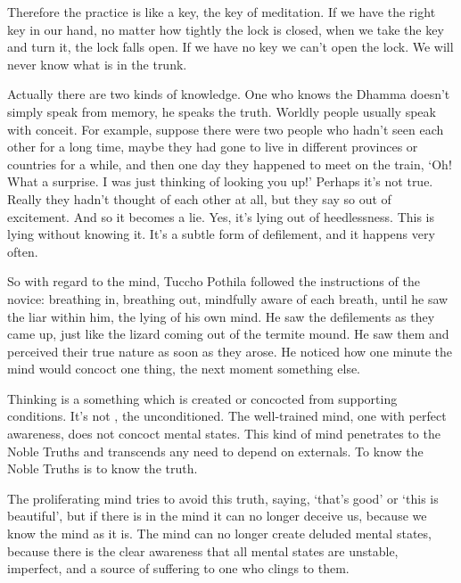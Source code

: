 Therefore the practice is like a key, the key of meditation. If we have the right key in our hand, no matter how tightly the lock is closed, when we take the key and turn it, the lock falls open. If we have no key we can't open the lock. We will never know what is in the trunk. 

Actually there are two kinds of knowledge. One who knows the Dhamma doesn't simply speak from memory, he speaks the truth. Worldly people usually speak with conceit. For example, suppose there were two people who hadn't seen each other for a long time, maybe they had gone to live in different provinces or countries for a while, and then one day they happened to meet on the train, `Oh! What a surprise. I was just thinking of looking you up!' Perhaps it's not true. Really they hadn't thought of each other at all, but they say so out of excitement. And so it becomes a lie. Yes, it's lying out of heedlessness. This is lying without knowing it. It's a subtle form of defilement, and it happens very often. 

So with regard to the mind, Tuccho Pothila followed the instructions of the novice: breathing in, breathing out, mindfully aware of each breath, until he saw the liar within him, the lying of his own mind. He saw the defilements as they came up, just like the lizard coming out of the termite mound. He saw them and perceived their true nature as soon as they arose. He noticed how one minute the mind would concoct one thing, the next moment something else. 

Thinking is a  something which is created or concocted from supporting conditions. It's not , the unconditioned. The well-trained mind, one with perfect awareness, does not concoct mental states. This kind of mind penetrates to the Noble Truths and transcends any need to depend on externals. To know the Noble Truths is to know the truth.

The proliferating mind tries to avoid this truth, saying, `that's good' or `this is beautiful', but if there is  in the mind it can no longer deceive us, because we know the mind as it is. The mind can no longer create deluded mental states, because there is the clear awareness that all mental states are unstable, imperfect, and a source of suffering to one who clings to them. 

